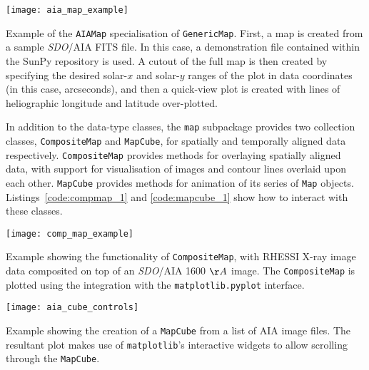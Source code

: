\begin{listing}[H]
\begin{center}
\texttt{[image: aia\_map\_example]}
\end{center}
\caption{Example of the \texttt{AIAMap} specialisation of 
\texttt{GenericMap}. First, a map is created from a sample \textit{SDO}/AIA FITS file. In this case, a demonstration file contained within the SunPy repository is used. A cutout
of the full map is then created by specifying the desired solar-$x$ and solar-$y$ ranges of the plot in data coordinates (in this case, arcseconds), and then a quick-view plot is created with lines of heliographic longitude and latitude over-plotted.}
\label{code:aia_1}
\end{listing}

In addition to the data-type classes, the \texttt{map} subpackage provides two 
collection classes, \texttt{CompositeMap} and \texttt{MapCube}, for 
spatially and temporally aligned data respectively.
\texttt{CompositeMap} provides methods for overlaying spatially aligned 
data, with support for visualisation of images and contour lines overlaid 
upon each other.
\texttt{MapCube} provides methods for animation of its series of \texttt{Map} 
objects. Listings~\ref{code:compmap_1} and \ref{code:mapcube_1} show how to 
interact with these classes.

\begin{listing}[H]
\begin{center}
\texttt{[image: comp\_map\_example]}
\end{center}
\caption{Example showing the functionality of \texttt{CompositeMap}, with RHESSI X-ray image data composited
on top of an \textit{SDO}/AIA 1600 $\AA$ image. The \texttt{CompositeMap} is plotted using the integration with the \texttt{matplotlib.pyplot} interface.}
\label{code:compmap_1}
\end{listing}

\begin{listing}[H]
\begin{center}
\texttt{[image: aia\_cube\_controls]}
\end{center}
\caption{Example showing the creation of a \texttt{MapCube} from a list of AIA image files. The 
resultant plot makes use of \texttt{matplotlib}'s interactive widgets to allow scrolling 
through the \texttt{MapCube}.}
\label{code:mapcube_1}
\end{listing}
